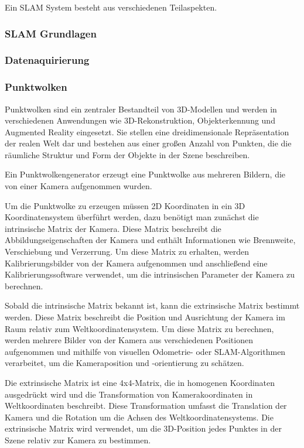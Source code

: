 Ein SLAM System besteht aus verschiedenen Teilaspekten.

\subsubsection{SLAM Grundlagen}

\subsubsection{Datenaquirierung}

\subsubsection{Punktwolken}

Punktwolken sind ein zentraler Bestandteil von 3D-Modellen und werden in verschiedenen Anwendungen wie 3D-Rekonstruktion, Objekterkennung und Augmented Reality eingesetzt. Sie stellen eine dreidimensionale Repräsentation der realen Welt dar und bestehen aus einer großen Anzahl von Punkten, die die räumliche Struktur und Form der Objekte in der Szene beschreiben.

Ein Punktwolkengenerator erzeugt eine Punktwolke aus mehreren Bildern, die von einer Kamera aufgenommen wurden.

Um die Punktwolke zu erzeugen müssen 2D Koordinaten in ein 3D Koordinatensystem überführt werden, dazu benötigt man zunächst die intrinsische Matrix der Kamera. Diese Matrix beschreibt die Abbildungseigenschaften der Kamera und enthält Informationen wie Brennweite, Verschiebung und Verzerrung. Um diese Matrix zu erhalten, werden Kalibrierungsbilder von der Kamera aufgenommen und anschließend eine Kalibrierungssoftware verwendet, um die intrinsischen Parameter der Kamera zu berechnen.

Sobald die intrinsische Matrix bekannt ist, kann die extrinsische Matrix bestimmt werden. Diese Matrix beschreibt die Position und Ausrichtung der Kamera im Raum relativ zum Weltkoordinatensystem. Um diese Matrix zu berechnen, werden mehrere Bilder von der Kamera aus verschiedenen Positionen aufgenommen und mithilfe von visuellen Odometrie- oder SLAM-Algorithmen verarbeitet, um die Kameraposition und -orientierung zu schätzen.

Die extrinsische Matrix ist eine 4x4-Matrix, die in homogenen Koordinaten ausgedrückt wird und die Transformation von Kamerakoordinaten in Weltkoordinaten beschreibt. Diese Transformation umfasst die Translation der Kamera und die Rotation um die Achsen des Weltkoordinatensystems. Die extrinsische Matrix wird verwendet, um die 3D-Position jedes Punktes in der Szene relativ zur Kamera zu bestimmen.

